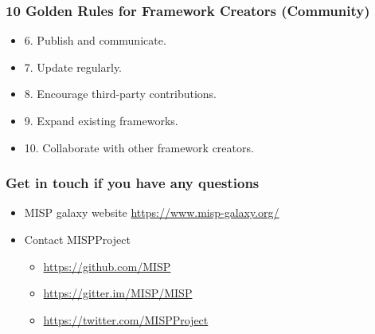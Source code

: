 \begin{frame}
        \frametitle{10 Golden Rules for Framework Creators (Community)}
        \begin{itemize}
            \item 6. Publish and communicate.
            \item 7. Update regularly.
            \item 8. Encourage third-party contributions.
            \item 9. Expand existing frameworks.
            \item 10. Collaborate with other framework creators.
        \end{itemize}
\end{frame}


\begin{frame}
  \frametitle{Get in touch if you have any questions}
  \begin{itemize}
    \item MISP galaxy website \url{https://www.misp-galaxy.org/}
    \item Contact MISPProject
    \begin{itemize}
      \item \url{https://github.com/MISP}
      \item \url{https://gitter.im/MISP/MISP}
      \item \url{https://twitter.com/MISPProject}
    \end{itemize}
  \end{itemize}
\end{frame}

